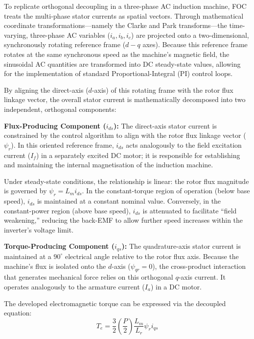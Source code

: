 \documentclass[12pt,a4paper]{report}
\begin{document}
To replicate orthogonal decoupling in a three-phase AC induction machine, FOC treats the multi-phase stator currents as spatial vectors. Through mathematical coordinate transformations—namely the Clarke and Park transforms—the time-varying, three-phase AC variables ($i_a, i_b, i_c$) are projected onto a two-dimensional, synchronously rotating reference frame ($d-q$ axes). Because this reference frame rotates at the same synchronous speed as the machine's magnetic field, the sinusoidal AC quantities are transformed into DC steady-state values, allowing for the implementation of standard Proportional-Integral (PI) control loops.

By aligning the direct-axis ($d$-axis) of this rotating frame with the rotor flux linkage vector, the overall stator current is mathematically decomposed into two independent, orthogonal components:

\textbf{Flux-Producing Component ($i_{ds}$):} The direct-axis stator current is constrained by the control algorithm to align with the rotor flux linkage vector ($\psi_r$). In this oriented reference frame, $i_{ds}$ acts analogously to the field excitation current ($I_f$) in a separately excited DC motor; it is responsible for establishing and maintaining the internal magnetisation of the induction machine.

Under steady-state conditions, the relationship is linear: the rotor flux magnitude is governed by $\psi_r = L_m i_{ds}$. In the constant-torque region of operation (below base speed), $i_{ds}$ is maintained at a constant nominal value. Conversely, in the constant-power region (above base speed), $i_{ds}$ is attenuated to facilitate ``field weakening,'' reducing the back-EMF to allow further speed increases within the inverter's voltage limit.

\textbf{Torque-Producing Component ($i_{qs}$):} The quadrature-axis stator current is maintained at a $90^\circ$ electrical angle relative to the rotor flux axis. Because the machine's flux is isolated onto the $d$-axis ($\psi_{qr} = 0$), the cross-product interaction that generates mechanical force relies on this orthogonal $q$-axis current. It operates analogously to the armature current ($I_a$) in a DC motor.

The developed electromagnetic torque can be expressed via the decoupled equation:
\begin{equation}
T_e = \frac{3}{2} \left(\frac{P}{2}\right) \frac{L_m}{L_r} \psi_r i_{qs}
\end{equation}
\end{document}
